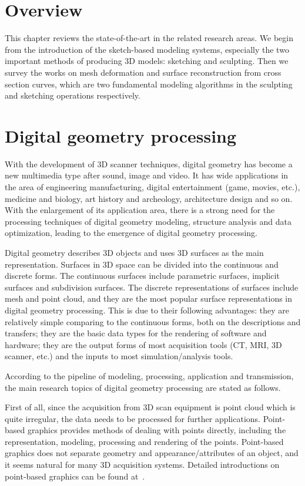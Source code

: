 \section{Overview}
\label{review:overview}

This chapter reviews the state-of-the-art in the related research areas. We begin from the introduction of the sketch-based modeling systems, especially the two important methods of producing 3D models: sketching and sculpting. Then we survey the works on mesh deformation and surface reconstruction from cross section curves, which are two fundamental modeling algorithms in the sculpting and sketching operations respectively.


\section{Digital geometry processing}
\label{ch2:sec:dgp}

With the development of 3D scanner techniques, digital geometry has become a new multimedia type after sound, image and video. It has wide applications in the area of engineering manufacturing, digital entertainment (game, movies, etc.), medicine and biology, art history and archeology, architecture design and so on. With the enlargement of its application area, there is a strong need for the processing techniques of digital geometry modeling, structure analysis and data optimization, leading to the emergence of digital geometry processing.

Digital geometry describes 3D objects and uses 3D surfaces as the main representation. Surfaces in 3D space can be divided into the continuous and discrete forms. The continuous surfaces include parametric surfaces, implicit surfaces and subdivision surfaces. The discrete representations of surfaces include mesh and point cloud, and they are the most popular surface representations in digital geometry processing. This is due to their following advantages: they are relatively simple comparing to the continuous forms, both on the descriptions and transfers; they are the basic data types for the rendering of software and hardware; they are the output forms of most acquisition tools (CT, MRI, 3D scanner, etc.) and the inputs to most simulation/analysis tools.

According to the pipeline of modeling, processing, application and transmission, the main research topics of digital geometry processing are stated as follows.

First of all, since the acquisition from 3D scan equipment is point cloud which is quite irregular, the data needs to be processed for further applications. Point-based graphics provides methods of dealing with points directly, including the representation, modeling, processing and rendering of the points. Point-based graphics does not separate geometry and appearance/attributes of an object, and it seems natural for many 3D acquisition systems. Detailed introductions on point-based graphics can be found at~\cite{AGPPSZ04,GM09}.

